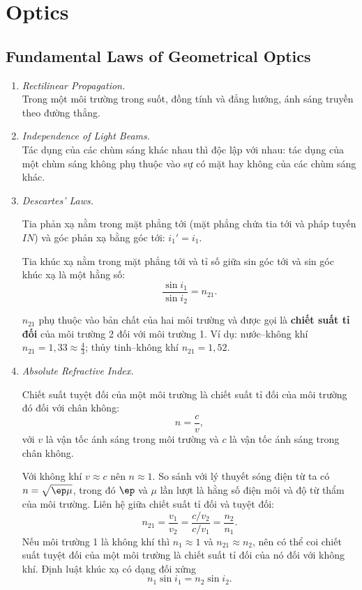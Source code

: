 \chapter{Optics}

\section{Fundamental Laws of Geometrical Optics}
\begin{enumerate}
\item \textit{Rectilinear Propagation.}\\
Trong một môi trường trong suốt, đồng tính và đẳng hướng, ánh sáng truyền theo đường thẳng.

\item \textit{Independence of Light Beams.}\\
Tác dụng của các chùm sáng khác nhau thì độc lập với nhau: tác dụng của một chùm sáng không phụ thuộc vào sự có mặt hay không của các chùm sáng khác.

\item \textit{Descartes' Laws.}\\
\begin{theorem}
Tia phản xạ nằm trong mặt phẳng tới (mặt phẳng chứa tia tới và pháp tuyến $IN$) và góc phản xạ bằng góc tới: $i_1' = i_1$.
\end{theorem}
\begin{theorem}
Tia khúc xạ nằm trong mặt phẳng tới và tỉ số giữa sin góc tới và sin góc khúc xạ là một hằng số:
\[
\frac{\sin i_1}{\sin i_2} = n_{21}.
\]
\end{theorem}
$n_{21}$ phụ thuộc vào bản chất của hai môi trường và được gọi là \textbf{chiết suất tỉ đối} của môi trường 2 đối với môi trường 1. Ví dụ: nước--không khí $n_{21} = 1{,}33 \approx \tfrac43$; thủy tinh--không khí $n_{21} = 1{,}52$.

\item \textit{Absolute Refractive Index.}\\
\begin{definition}
Chiết suất tuyệt đối của một môi trường là chiết suất tỉ đối của môi trường đó đối với chân không:
\[
n = \frac{c}{v},
\]
với $v$ là vận tốc ánh sáng trong môi trường và $c$ là vận tốc ánh sáng trong chân không.
\end{definition}
Với không khí $v \approx c$ nên $n \approx 1$. So sánh với lý thuyết sóng điện từ ta có $n = \sqrt{\ep\mu}$, trong đó $\ep$ và $\mu$ lần lượt là hằng số điện môi và độ từ thẩm của môi trường. Liên hệ giữa chiết suất tỉ đối và tuyệt đối:
\[
n_{21} = \frac{v_1}{v_2} = \frac{c/v_2}{c/v_1} = \frac{n_2}{n_1}.
\]
Nếu môi trường 1 là không khí thì $n_1 \approx 1$ và $n_{21} \approx n_2$, nên có thể coi chiết suất tuyệt đối của một môi trường là chiết suất tỉ đối của nó đối với không khí. Định luật khúc xạ có dạng đối xứng
\[
\boxed{n_1\sin i_1 = n_2\sin i_2}.
\]
\end{enumerate}

